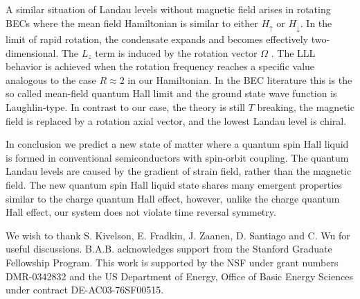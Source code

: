 \documentclass[prl,aps,amssymb,shownopacs,twocolumn]{revtex4}
\begin{document}
	A similar situation of Landau levels without magnetic field arises
	in rotating BECs where the mean field Hamiltonian is similar to
	either $H_\uparrow$ or $H_\downarrow$. In the limit of rapid
	rotation, the condensate expands and becomes effectively
	two-dimensional. The $L_z$ term is induced by the rotation vector
	$\Omega$ \cite{ho2001}. The LLL behavior is achieved when the
	rotation frequency reaches a specific value analogous to the case
	$R\approx 2$ in our Hamiltonian. In the BEC literature this is the
	so called mean-field quantum Hall limit and the ground state wave
	function is Laughlin-type. In contrast to our case, the theory is
	still $T$ breaking, the magnetic field is replaced by a rotation
	axial vector, and the lowest Landau level is chiral.
	
	In conclusion we predict a new state of matter where a quantum
	spin Hall liquid is formed in conventional semiconductors with
	spin-orbit coupling. The quantum Landau levels are caused by the
	gradient of strain field, rather than the magnetic field. The new
	quantum spin Hall liquid state shares many emergent properties
	similar to the charge quantum Hall effect, however, unlike the
	charge quantum Hall effect, our system does not violate time
	reversal symmetry.
	
	
	We wish to thank S. Kivelson, E. Fradkin, J. Zaanen, D. Santiago and
	C. Wu for useful discussions. B.A.B. acknowledges support from the
	Stanford Graduate Fellowship Program. This work is supported by the
	NSF under grant numbers DMR-0342832 and the US Department of Energy,
	Office of Basic Energy Sciences under contract DE-AC03-76SF00515.
	
\end{document}
